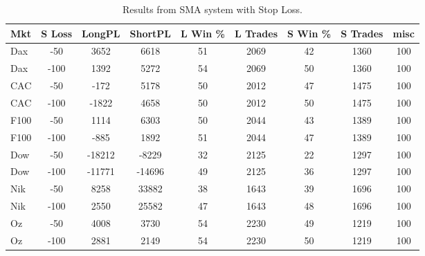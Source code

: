 \begin{table}[ht]
\centering
\caption[SMA Base System with Stop Loss]{Results from SMA system with Stop Loss.} 
\label{tab:sma_results_Sloss}
\begin{tabular}{lcccccccc}
  \toprule Mkt & S Loss & LongPL & ShortPL & L Win \% & L Trades & S Win \% & S Trades & misc \\ 
  \midrule Dax & -50 & 3652 & 6618 & 51 & 2069 & 42 & 1360 & 100 \\ 
  Dax & -100 & 1392 & 5272 & 54 & 2069 & 50 & 1360 & 100 \\ 
  CAC & -50 & -172 & 5178 & 50 & 2012 & 47 & 1475 & 100 \\ 
  CAC & -100 & -1822 & 4658 & 50 & 2012 & 50 & 1475 & 100 \\ 
  F100 & -50 & 1114 & 6303 & 50 & 2044 & 43 & 1389 & 100 \\ 
  F100 & -100 & -885 & 1892 & 51 & 2044 & 47 & 1389 & 100 \\ 
  Dow & -50 & -18212 & -8229 & 32 & 2125 & 22 & 1297 & 100 \\ 
  Dow & -100 & -11771 & -14696 & 49 & 2125 & 36 & 1297 & 100 \\ 
  Nik & -50 & 8258 & 33882 & 38 & 1643 & 39 & 1696 & 100 \\ 
  Nik & -100 & 2550 & 25582 & 47 & 1643 & 48 & 1696 & 100 \\ 
  Oz & -50 & 4008 & 3730 & 54 & 2230 & 49 & 1219 & 100 \\ 
  Oz & -100 & 2881 & 2149 & 54 & 2230 & 50 & 1219 & 100 \\ 
   \bottomrule \end{tabular}
\end{table}
